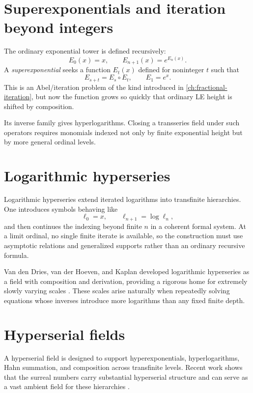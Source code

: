 \documentclass[11pt,openany]{book}
\theoremstyle{definition}
\theoremstyle{plain}
\theoremstyle{remark}
\begin{document}
\section{Superexponentials and iteration beyond integers}

The ordinary exponential tower is defined recursively:
\[
 E_0(x)=x,
 \qquad
 E_{n+1}(x)=e^{E_n(x)}.
\]
A \emph{superexponential} seeks a function $E_t(x)$ defined for noninteger $t$ such that
\[
 E_{s+t}=E_s\circ E_t,
 \qquad
 E_1=e^x.
\]
This is an Abel/iteration problem of the kind introduced in \cref{ch:fractional-iteration}, but now the function grows so quickly that ordinary LE height is shifted by composition.

Its inverse family gives hyperlogarithms. Closing a transseries field under such operators requires monomials indexed not only by finite exponential height but by more general ordinal levels.

\section{Logarithmic hyperseries}

Logarithmic hyperseries extend iterated logarithms into transfinite hierarchies. One introduces symbols behaving like
\[
 \ell_0=x,
 \qquad
 \ell_{n+1}=\log\ell_n,
\]
and then continues the indexing beyond finite $n$ in a coherent formal system. At a limit ordinal, no single finite iterate is available, so the construction must use asymptotic relations and generalized supports rather than an ordinary recursive formula.

Van den Dries, van der Hoeven, and Kaplan developed logarithmic hyperseries as a field with composition and derivation, providing a rigorous home for extremely slowly varying scales \cite{log-hyperseries}. These scales arise naturally when repeatedly solving equations whose inverses introduce more logarithms than any fixed finite depth.

\section{Hyperserial fields}

A hyperserial field is designed to support hyperexponentials, hyperlogarithms, Hahn summation, and composition across transfinite levels. Recent work shows that the surreal numbers carry substantial hyperserial structure and can serve as a vast ambient field for these hierarchies \cite{hyperserial-field,surreal-hyperseries}.
\end{document}
